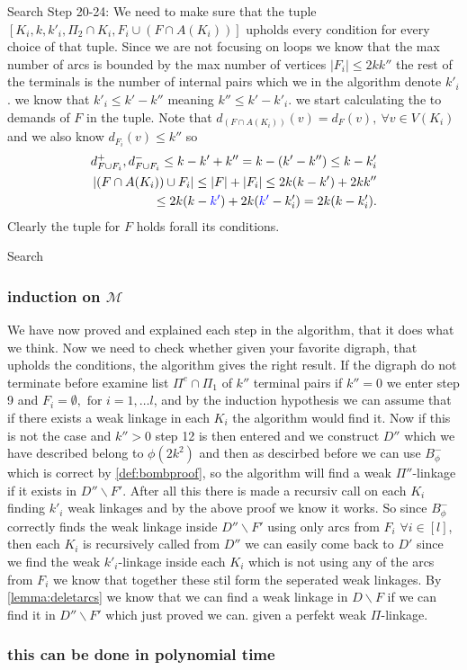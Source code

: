 \documentclass{beamer}
\begin{document}
\begin{frame}[allowframebreaks]{Search}
    Step 20-24: We need to make sure that the tuple $[K_i,k,k'_i,\Pi_2 \cap K_i,F_i\cup(F\cap A(K_i))]$ upholds every condition for every choice of that tuple. 
    Since we are not focusing on loops we know that the max number of arcs is bounded by the max number of vertices $|F_i|\leq 2kk''$ the rest of the terminals is the number of internal pairs which we in the algorithm denote $k'_i$. we know that $k'_i\leq k'-k''$ meaning $k''\leq k'-k'_i$.
    we start calculating the to demands of $F$ in the tuple.
    Note that $d_{(F\cap A(K_i))}(v)=d_{F}(v), \ \forall v\in V(K_i)$ and we also know $d_{F_i}(v)\leq k''$ so
    \begin{align}
        d^+_{F\cup F_i},d^-_{F\cup F_i}\leq k-k' + k'' = k-(k'-k'')\leq k- k'_i \\
        |(F \cap A(K_i))\cup F_i|\leq |F|+|F_i|\leq 2k(k-k') +2kk''\\
        \leq 2k(k-\textcolor{blue}{k'})+2k(\textcolor{blue}{k'}-k'_i)=2k(k-k'_i).
    \end{align}
    Clearly the tuple for $F$ holds forall its conditions.
\end{frame} 

\begin{frame}[allowframebreaks]{Search}
    \frametitle{induction on $\mathcal{M}$}
    We have now proved and explained each step in the algorithm, that it does what we think. 
    Now we need to check whether given your favorite digraph, that upholds the conditions, the algorithm gives the right result.
    If the digraph do not terminate before examine list $\Pi^e\cap \Pi_1$ of $k''$ terminal pairs if $k''=0$ we enter step 9 and $F_i=\emptyset, \text{ for } i=1,\dots l$, and by the induction hypothesis we can assume that if there exists a weak linkage in each $K_i$ the algorithm would find it. 
    Now if this is not the case and $k''>0$ step 12 is then entered and we construct $D''$ which we have described belong to $\phi(2k^2)$ and then as descirbed before we can use $B_\phi^-$ which is correct by \autoref{def:bombproof}, so the algorithm will find a weak $\Pi''$-linkage if it exists in $D''\backslash F'$. 
    After all this there is made a recursiv call on each $K_i$ finding $k'_i$ weak linkages and by the above proof we know it works. 
    So since $B_\phi^-$ correctly finds the weak linkage inside $D''\backslash F'$ using only arcs from $F_i$ $\forall i\in[l]$, then each $K_i$ is recursively called from $D''$ we can easily come back to $D'$ since we find the weak $k'_i$-linkage inside each $K_i$ which is not using any of the arcs from $F_i$ we know that together these stil form the seperated weak linkages.
    By \autoref{lemma:deletarcs} we know that we can find a weak linkage in $D\backslash F$ if we can find it in $D''\backslash F'$ which just proved we can. given a perfekt weak $\Pi$-linkage.
\end{frame}

\begin{frame}
    \frametitle{this can be done in polynomial time}
     
\end{frame}



\end{document}
